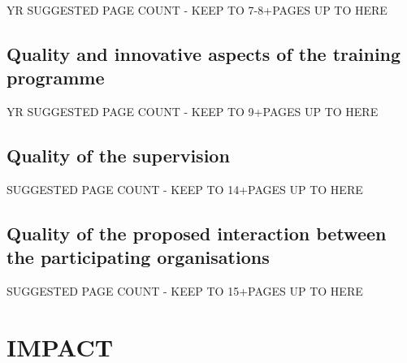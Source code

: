 \documentclass[11pt,a4paper]{article}
\begin{document}
{\scriptsize \noindent \color{red} YR SUGGESTED PAGE COUNT - KEEP TO 7-8+\numberofextrapages PAGES UP TO HERE \\

\vspace{-2mm}
\subsection{Quality and innovative aspects of the training programme}
\label{sec:training}

\label{sub:trainingOverview}
\processdelayedfloats

{\scriptsize \noindent \color{red} YR SUGGESTED PAGE COUNT - KEEP TO 9+\numberofextrapages PAGES UP TO HERE \\

\vspace{-2mm}
\subsection{Quality of the supervision}
\label{sec:supervision}

\processdelayedfloats

{\scriptsize \noindent \color{red} SUGGESTED PAGE COUNT - KEEP TO 14+\numberofextrapages PAGES UP TO HERE \\


\vspace{-2mm}
\subsection{Quality of the proposed interaction between the participating organisations}

\label{sec:qualityInteraction}
\processdelayedfloats


{\scriptsize \noindent \color{red} SUGGESTED PAGE COUNT - KEEP TO 15+\numberofextrapages PAGES UP TO HERE \\

\vspace{-2mm}
\section{IMPACT}

}}}}
\end{document}
